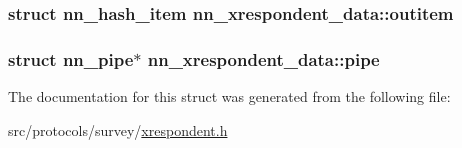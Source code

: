 \subsubsection[{outitem}]{\setlength{\rightskip}{0pt plus 5cm}struct {\bf nn\+\_\+hash\+\_\+item} nn\+\_\+xrespondent\+\_\+data\+::outitem}\hypertarget{structnn__xrespondent__data_a76ec23d34f74a173d721e768e0eb09e4}{}\label{structnn__xrespondent__data_a76ec23d34f74a173d721e768e0eb09e4}
\subsubsection[{pipe}]{\setlength{\rightskip}{0pt plus 5cm}struct nn\+\_\+pipe$\ast$ nn\+\_\+xrespondent\+\_\+data\+::pipe}\hypertarget{structnn__xrespondent__data_add6861ce1f3977a99871f23d62851a10}{}\label{structnn__xrespondent__data_add6861ce1f3977a99871f23d62851a10}


The documentation for this struct was generated from the following file\+:\begin{DoxyCompactItemize}
\item 
src/protocols/survey/\hyperlink{xrespondent_8h}{xrespondent.\+h}\end{DoxyCompactItemize}
